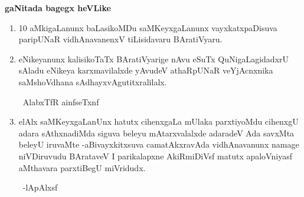 \begin{center}
{\bf gaNitada bagegx heVLike}
\end{center}
\begin{enumerate}[\rm 1]
\item {\rm 10} aMkigaLanunx baLasikoMDu saMKeyxgaLanunx vayxkatxpaDisuva paripUNaR vidhAna\-vanenxV tiLisidavaru BAratiVyaru.

\item eNikeyanunx kalisikoTaTx BAratiVyarige nAvu eSuTx QuNigaLagidadxrU sAladu eNikeya karxmavilalxde yAvudeV athaRpUNaR veYjAcnxnika saMshoVdhana sAdhayx\-vAgutitxralilalx.

~\hfill AlabxTfR ainfseTxnf

\item elAlx saMKeyxgaLanUnx hatutx cihenxgaLa mUlaka parxtiyoMdu cihenxgU adara sAthxnadiMda siguva beleyu mAtarxvalalxde adaradeV Ada savxMta beleyU iruvaMte -aBivayxkitxsuva camatAkxravAda vidhAnavanunx namage niVDiruvudu BArataveV I parikalapxne AkiRmiDiVsf matutx apaloVniyasf aMthavara parxtiBegU miVridudx.

~\hfill -lApAlxsf

\end{enumerate}
